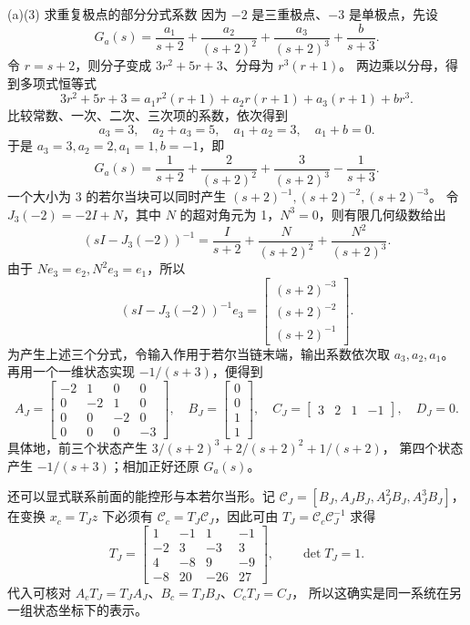 \documentclass[11pt]{article}
\begin{document}
\begin{solution}
\begin{proofstep}{(a)(3) 求重复极点的部分分式系数}
因为 $-2$ 是三重极点、$-3$ 是单极点，先设
\[
G_a(s)=\frac{a_1}{s+2}+\frac{a_2}{(s+2)^2}
+\frac{a_3}{(s+2)^3}+\frac{b}{s+3}.
\]
令 $r=s+2$，则分子变成 $3r^2+5r+3$、分母为 $r^3(r+1)$。
两边乘以分母，得到多项式恒等式
\[
3r^2+5r+3=a_1r^2(r+1)+a_2r(r+1)+a_3(r+1)+br^3.
\]
比较常数、一次、二次、三次项的系数，依次得到
\[
a_3=3,\quad a_2+a_3=5,\quad a_1+a_2=3,\quad a_1+b=0.
\]
于是 $a_3=3,a_2=2,a_1=1,b=-1$，即
\[
G_a(s)=\frac1{s+2}+\frac2{(s+2)^2}+\frac3{(s+2)^3}-\frac1{s+3}.
\]
一个大小为 3 的若尔当块可以同时产生 $(s+2)^{-1},(s+2)^{-2},(s+2)^{-3}$。
令 $J_3(-2)=-2I+N$，其中 $N$ 的超对角元为 1，$N^3=0$，则有限几何级数给出
\[
(sI-J_3(-2))^{-1}
=\frac{I}{s+2}+\frac{N}{(s+2)^2}+\frac{N^2}{(s+2)^3}.
\]
由于 $Ne_3=e_2,N^2e_3=e_1$，所以
\[
(sI-J_3(-2))^{-1}e_3=
\begin{bmatrix}(s+2)^{-3}\\(s+2)^{-2}\\(s+2)^{-1}\end{bmatrix}.
\]
为产生上述三个分式，令输入作用于若尔当链末端，输出系数依次取 $a_3,a_2,a_1$。
再用一个一维状态实现 $-1/(s+3)$，便得到
\[
A_J=\begin{bmatrix}-2&1&0&0\\0&-2&1&0\\0&0&-2&0\\0&0&0&-3\end{bmatrix},\quad
B_J=\begin{bmatrix}0\\0\\1\\1\end{bmatrix},\quad
C_J=\begin{bmatrix}3&2&1&-1\end{bmatrix},\quad D_J=0.
\]
具体地，前三个状态产生 $3/(s+2)^3+2/(s+2)^2+1/(s+2)$，
第四个状态产生 $-1/(s+3)$；相加正好还原 $G_a(s)$。

还可以显式联系前面的能控形与本若尔当形。记
$\mathcal C_J=[B_J,A_JB_J,A_J^2B_J,A_J^3B_J]$，在变换 $x_c=T_Jz$ 下必须有
$\mathcal C_c=T_J\mathcal C_J$，因此可由 $T_J=\mathcal C_c\mathcal C_J^{-1}$ 求得
\[
T_J=\begin{bmatrix}
1&-1&1&-1\\-2&3&-3&3\\4&-8&9&-9\\-8&20&-26&27
\end{bmatrix},\qquad \det T_J=1.
\]
代入可核对 $A_cT_J=T_JA_J$、$B_c=T_JB_J$、$C_cT_J=C_J$，
所以这确实是同一系统在另一组状态坐标下的表示。
\end{proofstep}


\end{solution}
\end{document}
